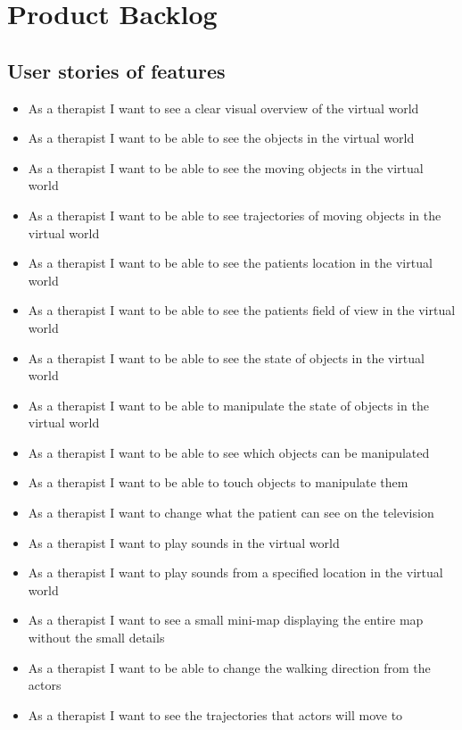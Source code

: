 \documentclass[11pt]{article}
\begin{document}
\section{Product Backlog}
	\subsection{User stories of features}
    
    \begin{itemize}
		\item As a therapist I want to see a clear visual overview of the virtual world
        \item As a therapist I want to be able to see the objects in the virtual world
        \item As a therapist I want to be able to see the moving objects in the virtual world
        \item As a therapist I want to be able to see trajectories of moving objects in the virtual world
        \item As a therapist I want to be able to see the patients location in the virtual world
        \item As a therapist I want to be able to see the patients field of view in the virtual world
        \item As a therapist I want to be able to see the state of objects in the virtual world
        \item As a therapist I want to be able to manipulate the state of objects in the virtual world
        \item As a therapist I want to be able to see which objects can be manipulated
        \item As a therapist I want to be able to touch objects to manipulate them
        \item As a therapist I want to change what the patient can see on the television
        \item As a therapist I want to play sounds in the virtual world
        \item As a therapist I want to play sounds from a specified location in the virtual world
        \item As a therapist I want to see a small mini-map displaying the entire map without the small details
        \item As a therapist I want to be able to change the walking direction from the actors
        \item As a therapist I want to see the trajectories that actors will move to

\end{itemize}
\end{document}
